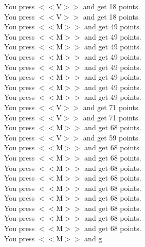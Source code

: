 \documentclass[pdflatex,sn-nature]{sn-jnl}%
\theoremstyle{thmstyleone}%
\theoremstyle{thmstyletwo}%
\theoremstyle{thmstylethree}%
\begin{document}
You press $<<$V$>>$ and get 18 points. $~$\\ 
You press $<<$V$>>$ and get 18 points. $~$\\ 
You press $<<$M$>>$ and get 49 points. $~$\\ 
You press $<<$M$>>$ and get 49 points. $~$\\ 
You press $<<$M$>>$ and get 49 points. $~$\\ 
You press $<<$M$>>$ and get 49 points. $~$\\ 
You press $<<$M$>>$ and get 49 points. $~$\\ 
You press $<<$M$>>$ and get 49 points. $~$\\ 
You press $<<$M$>>$ and get 49 points. $~$\\ 
You press $<<$M$>>$ and get 49 points. $~$\\ 
You press $<<$V$>>$ and get 71 points. $~$\\ 
You press $<<$V$>>$ and get 71 points. $~$\\ 
You press $<<$M$>>$ and get 68 points. $~$\\ 
You press $<<$V$>>$ and get 59 points. $~$\\ 
You press $<<$M$>>$ and get 68 points. $~$\\ 
You press $<<$M$>>$ and get 68 points. $~$\\ 
You press $<<$M$>>$ and get 68 points. $~$\\ 
You press $<<$M$>>$ and get 68 points. $~$\\ 
You press $<<$M$>>$ and get 68 points. $~$\\ 
You press $<<$M$>>$ and get 68 points. $~$\\ 
You press $<<$M$>>$ and get 68 points. $~$\\ 
You press $<<$M$>>$ and get 68 points. $~$\\ 
You press $<<$M$>>$ and get 68 points. $~$\\ 
You press $<<$M$>>$ and g 
\end{document}
